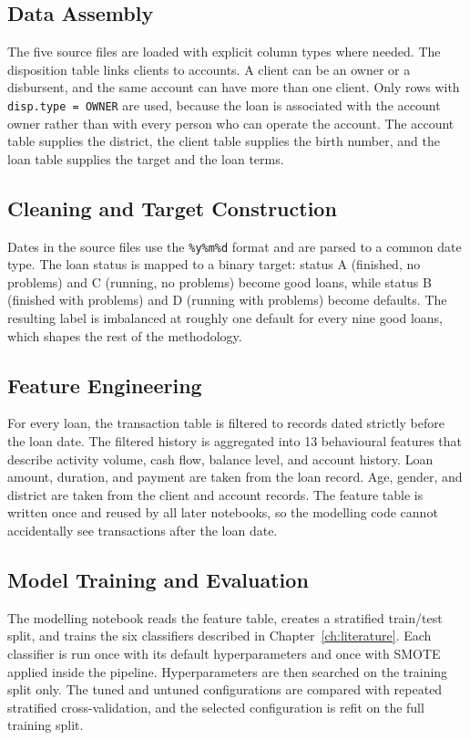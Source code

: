 \subsection{Data Assembly}
The five source files are loaded with explicit column types where needed. The disposition table links clients to accounts. A client can be an owner or a disbursent, and the same account can have more than one client. Only rows with \texttt{disp.type = OWNER} are used, because the loan is associated with the account owner rather than with every person who can operate the account. The account table supplies the district, the client table supplies the birth number, and the loan table supplies the target and the loan terms.

\subsection{Cleaning and Target Construction}
Dates in the source files use the \texttt{\%y\%m\%d} format and are parsed to a common date type. The loan status is mapped to a binary target: status A (finished, no problems) and C (running, no problems) become good loans, while status B (finished with problems) and D (running with problems) become defaults. The resulting label is imbalanced at roughly one default for every nine good loans, which shapes the rest of the methodology.

\subsection{Feature Engineering}
For every loan, the transaction table is filtered to records dated strictly before the loan date. The filtered history is aggregated into 13 behavioural features that describe activity volume, cash flow, balance level, and account history. Loan amount, duration, and payment are taken from the loan record. Age, gender, and district are taken from the client and account records. The feature table is written once and reused by all later notebooks, so the modelling code cannot accidentally see transactions after the loan date.

\subsection{Model Training and Evaluation}
The modelling notebook reads the feature table, creates a stratified train/test split, and trains the six classifiers described in Chapter~\ref{ch:literature}. Each classifier is run once with its default hyperparameters and once with SMOTE applied inside the pipeline. Hyperparameters are then searched on the training split only. The tuned and untuned configurations are compared with repeated stratified cross-validation, and the selected configuration is refit on the full training split.

